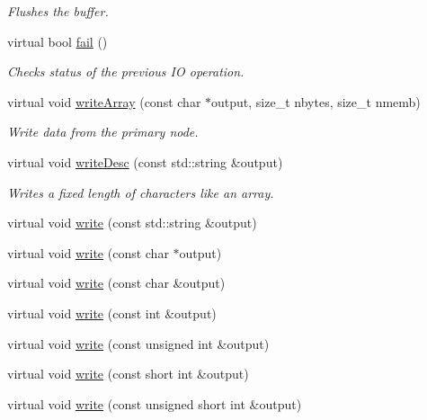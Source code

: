 \begin{DoxyCompactItemize}
\begin{DoxyCompactList}\small\item\em Flushes the buffer. \end{DoxyCompactList}\item 
virtual bool \mbox{\hyperlink{classADATIO_1_1BinaryWriter_af549adfdbe2c671008ad58952b34b06e}{fail}} ()
\begin{DoxyCompactList}\small\item\em Checks status of the previous IO operation. \end{DoxyCompactList}\item 
virtual void \mbox{\hyperlink{classADATIO_1_1BinaryWriter_a9a21d60e9c62d38226f7dd6989aa2d7d}{write\+Array}} (const char $\ast$output, size\+\_\+t nbytes, size\+\_\+t nmemb)
\begin{DoxyCompactList}\small\item\em Write data from the primary node. \end{DoxyCompactList}\item 
virtual void \mbox{\hyperlink{classADATIO_1_1BinaryWriter_a616c82aa0768386f730781d4e8552328}{write\+Desc}} (const std\+::string \&output)
\begin{DoxyCompactList}\small\item\em Writes a fixed length of characters like an array. \end{DoxyCompactList}\item 
virtual void \mbox{\hyperlink{classADATIO_1_1BinaryWriter_ac7731874e4949f80f0edbad2474c4b64}{write}} (const std\+::string \&output)
\item 
virtual void \mbox{\hyperlink{classADATIO_1_1BinaryWriter_add59d41e33f9b8c1ef59247c8bf59084}{write}} (const char $\ast$output)
\item 
virtual void \mbox{\hyperlink{classADATIO_1_1BinaryWriter_a910cfae9646644ba79a79b5686099fa9}{write}} (const char \&output)
\item 
virtual void \mbox{\hyperlink{classADATIO_1_1BinaryWriter_a9fb82fed7fa1a453686b39469528735b}{write}} (const int \&output)
\item 
virtual void \mbox{\hyperlink{classADATIO_1_1BinaryWriter_a8598a3f7e532ca1b4c12080810e4af23}{write}} (const unsigned int \&output)
\item 
virtual void \mbox{\hyperlink{classADATIO_1_1BinaryWriter_ad03df4b7455f1de8a8a9398f812c221d}{write}} (const short int \&output)
\item 
virtual void \mbox{\hyperlink{classADATIO_1_1BinaryWriter_ac86f9ad5ac94ba5d2b9f082910016621}{write}} (const unsigned short int \&output)

\end{DoxyCompactItemize}
